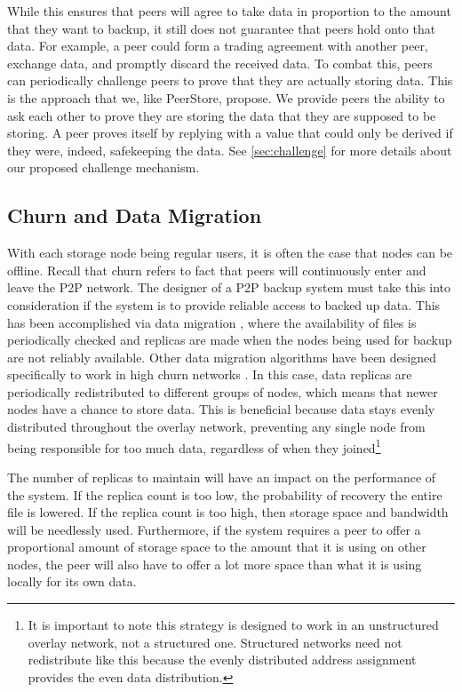 \documentclass[12pt]{report}
\begin{document}
While this ensures that peers will agree to take data in proportion to the amount that they want to backup, it still does not guarantee that peers hold onto that data. For example, a peer could form a trading agreement with another peer, exchange data, and promptly discard the received data. To combat this, peers can periodically challenge peers to prove that they are actually storing data. This is the approach that we, like PeerStore, propose. We provide peers the ability to ask each other to prove they are storing the data that they are supposed to be storing. A peer proves itself by replying with a value that could only be derived if they were, indeed, safekeeping the data. See \ref{sec:challenge} for more details about our proposed challenge mechanism.

\subsection{Churn and Data Migration} \label{sec:churn}
With each storage node being regular users, it is often the case that nodes can be offline. Recall that churn refers to fact that peers will continuously enter and leave the P2P network. The designer of a P2P backup system must take this into consideration if the system is to provide reliable access to backed up data. This has been accomplished via data migration \cite{pStore,PeerStore}, where the availability of files is periodically checked and replicas are made when the nodes being used for backup are not reliably available. Other data migration algorithms have been designed specifically to work in high churn networks \cite{StorageSearchP2PNetworks}. In this case, data replicas are periodically redistributed to different groups of nodes, which means that newer nodes have a chance to store data. This is beneficial because data stays evenly distributed throughout the overlay network, preventing any single node from being responsible for too much data, regardless of when they joined\footnote{It is important to note this strategy is designed to work in an unstructured overlay network, not a structured one. Structured networks need not redistribute like this because the evenly distributed address assignment provides the even data distribution.}

The number of replicas to maintain will have an impact on the performance of the system. If the replica count is too low, the probability of recovery the entire file is lowered. If the replica count is too high, then storage space and bandwidth will be needlessly used. Furthermore, if the system requires a peer to offer a proportional amount of storage space to the amount that it is using on other nodes, the peer will also have to offer a lot more space than what it is using locally for its own data. %
\end{document}
